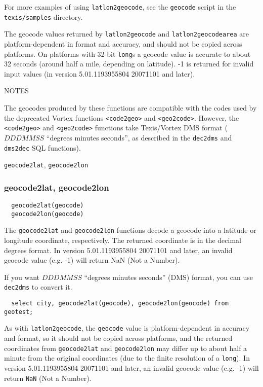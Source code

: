 For more examples of using \verb`latlon2geocode`, see the
\verb`geocode` script in the \verb`texis/samples` directory.

\CAVEATS

The geocode values returned by \verb`latlon2geocode` and
\verb`latlon2geocodearea` are platform-dependent in format and
accuracy, and should not be copied across platforms. On platforms with
32-bit \verb`long`s a geocode value is accurate to about 32 seconds
(around half a mile, depending on latitude).  -1 is returned for
invalid input values (in version 5.01.1193955804 20071101 and later).

NOTES

The geocodes produced by these functions are compatible with the codes
used by the deprecated Vortex functions \verb`<code2geo>` and
\verb`<geo2code>`.  However, the \verb`<code2geo>` and
\verb`<geo2code>` functions take Texis/Vortex DMS format ($DDDMMSS$
``degrees minutes seconds'', as described in the \verb`dec2dms` and
\verb`dms2dec` SQL functions).

\SEE

\verb`geocode2lat`, \verb`geocode2lon`

\subsubsection{geocode2lat, geocode2lon}

\begin{verbatim}
  geocode2lat(geocode)
  geocode2lon(geocode)
\end{verbatim}

The \verb`geocode2lat` and \verb`geocode2lon` functions decode a
geocode into a latitude or longitude coordinate, respectively.  The
returned coordinate is in the decimal degrees format.  In
version 5.01.1193955804 20071101 and later, an invalid geocode value
(e.g. -1) will return NaN (Not a Number).

If you want $DDDMMSS$ ``degrees minutes seconds'' (DMS) format, you
can use \verb`dec2dms` to convert it.

\EXAMPLE

\begin{verbatim}
  select city, geocode2lat(geocode), geocode2lon(geocode) from geotest;
\end{verbatim}

\CAVEATS

As with \verb`latlon2geocode`, the \verb`geocode` value is platform-dependent
in accuracy and format, so it should not be copied across platforms,
and the returned coordinates from \verb`geocode2lat` and
\verb`geocode2lon` may differ up to about half a minute from the
original coordinates (due to the finite resolution of a \verb`long`).
In version 5.01.1193955804 20071101 and later, an invalid geocode value
(e.g. -1) will return \verb`NaN` (Not a Number).

